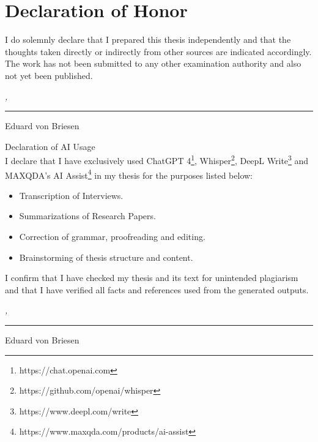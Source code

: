 %
\chapter*{Declaration of Honor}
\label{sec:declaration}
\thispagestyle{empty}

\vspace*{-10mm}

I do solemnly declare that I prepared this thesis independently and that the thoughts taken directly or indirectly from other sources are indicated accordingly.
The work has not been submitted to any other examination authority and also not
yet been published.

\bigskip

\noindent\textit{\thesisUniversityCity, \thesisDate}

\smallskip

\begin{flushright}
	\begin{minipage}{5cm}
		\rule{\textwidth}{1pt}
		\centering Eduard von Briesen
	\end{minipage}
\end{flushright}

\vspace*{10mm}

{Declaration of AI Usage} \\

I declare that I have exclusively used ChatGPT 4\footnote{https://chat.openai.com}, Whisper\footnote{https://github.com/openai/whisper}, DeepL Write\footnote{https://www.deepl.com/write} and MAXQDA's AI Assist\footnote{https://www.maxqda.com/products/ai-assist} in my thesis for the purposes listed below:

\begin{itemize}
	\item Transcription of Interviews.
	\item Summarizations of Research Papers.
	\item Correction of grammar, proofreading and editing.
	\item Brainstorming of thesis structure and content.
\end{itemize}

I confirm that I have checked my thesis and its text for unintended plagiarism and that I have verified all facts and references used from the generated outputs.

\bigskip

\noindent\textit{\thesisUniversityCity, \thesisDate}

\smallskip

\begin{flushright}
	\begin{minipage}{5cm}
		\rule{\textwidth}{1pt}
		\centering Eduard von Briesen
	\end{minipage}
\end{flushright}

